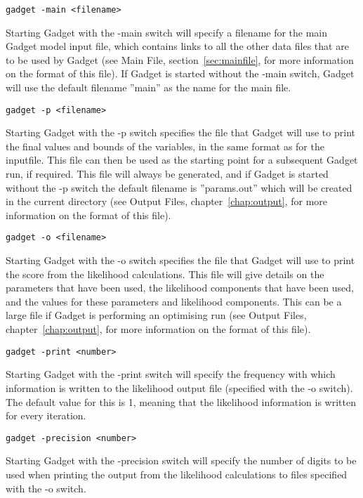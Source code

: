 \documentclass[10pt,twoside]{book}
\begin{document}
{\small\begin{verbatim}
gadget -main <filename>
\end{verbatim}}
Starting Gadget with the -main switch will specify a filename for the main Gadget model input file, which contains links to all the other data files that are to be used by Gadget (see Main File, section~\ref{sec:mainfile}, for more information on the format of this file).  If Gadget is started without the -main switch, Gadget will use the default filename ''main'' as the name for the main file.

\newpage %
{\small\begin{verbatim}
gadget -p <filename>
\end{verbatim}}
Starting Gadget with the -p switch specifies the file that Gadget will use to print the final values and bounds of the variables, in the same format as for the inputfile.  This file can then be used as the starting point for a subsequent Gadget run, if required.  This file will always be generated, and if Gadget is started without the -p switch the default filename is ''params.out'' which will be created in the current directory (see Output Files, chapter~\ref{chap:output}, for more information on the format of this file).

{\small\begin{verbatim}
gadget -o <filename>
\end{verbatim}}
Starting Gadget with the -o switch specifies the file that Gadget will use to print the score from the likelihood calculations.  This file will give details on the parameters that have been used, the likelihood components that have been used, and the values for these parameters and likelihood components.  This can be a large file if Gadget is performing an optimising run (see Output Files, chapter~\ref{chap:output}, for more information on the format of this file).

{\small\begin{verbatim}
gadget -print <number>
\end{verbatim}}
Starting Gadget with the -print switch will specify the frequency with which information is written to the likelihood output file (specified with the -o switch).  The default value for this is 1, meaning that the likelihood information is written for every iteration.

{\small\begin{verbatim}
gadget -precision <number>
\end{verbatim}}
Starting Gadget with the -precision switch will specify the number of digits to be used when printing the output from the likelihood calculations to files specified with the -o switch.
\end{document}
